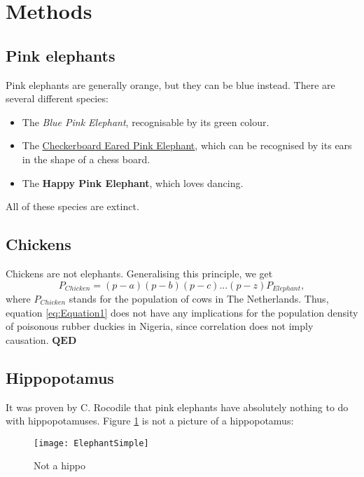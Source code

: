 \section{Methods}
\label{sec:Methods}

\subsection{Pink elephants}
Pink elephants are generally orange, but they can be blue instead. There are several different species:
\begin{itemize}
\item The \emph{Blue Pink Elephant}, recognisable by its green colour.
\item The \underline{Checkerboard Eared Pink Elephant}, which can be recognised by its ears in the shape of a chess board.
\item The \textbf{Happy Pink Elephant}, which loves dancing.
\end{itemize}
All of these species are extinct.

\subsection{Chickens}
Chickens are not elephants. Generalising this principle, we get
\begin{equation}
	P_{Chicken} = (p - a)(p - b)(p - c) ... (p - z)P_{Elephant},
	\label{eq:Equation1}
\end{equation}
where $P_{Chicken}$ stands for the population of cows in The Netherlands. Thus, equation \ref{eq:Equation1} does not have any implications for the population density of poisonous rubber duckies in Nigeria, since correlation does not imply causation. $\mathbf{QED}$

\newpage 

\subsection{Hippopotamus}
It was proven by C. Rocodile \cite{Rocodile2014} that pink elephants have absolutely nothing to do with hippopotamuses. Figure \ref{fig:Elephant} is not a picture of a hippopotamus:
\begin{figure}[h]
	\centering
	\texttt{[image: ElephantSimple]}
	\caption{Not a hippo}
	\label{fig:Elephant}
\end{figure}


